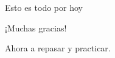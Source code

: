 \documentclass[11pt,handout,aspectratio=1610]{beamer}
\newcommand{\fdiff}[2]{\dfrac{\text{d} #1}{\text{d} #2}}
\newcommand{\vs}{\vspace{11pt}}
\begin{document}




    


    





    
    


\begin{frame}{Esto es todo por hoy}

    \begin{center}
        {\huge ¡Muchas gracias!}

        \vs

        Ahora a repasar y practicar.
    \end{center}

\end{frame}
\end{document}
